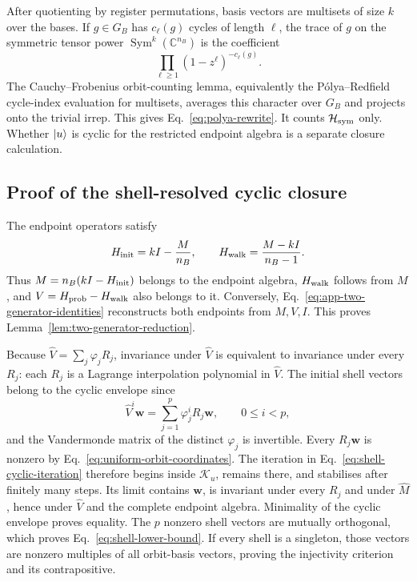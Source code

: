 After quotienting by register permutations, basis vectors are multisets of
size $k$ over the bases.  If $g\in G_B$ has $c_\ell(g)$ cycles
of length $\ell$, the trace of $g$ on
the symmetric tensor power $\operatorname{Sym}^k(\mathbb C^{n_B})$ is the
coefficient
\begin{equation}
 [z^k]\prod_{\ell\geq1}(1-z^\ell)^{-c_\ell(g)}.
\end{equation}
The Cauchy--Frobenius orbit-counting lemma, equivalently the
P\'olya--Redfield cycle-index evaluation for multisets, averages this
character over $G_B$ and projects onto the trivial irrep.  This gives
Eq.~\eqref{eq:polya-rewrite}.  It counts
$\mathcal H_{\rm sym}$ only.  Whether $\lvert u\rangle$ is cyclic for the restricted
endpoint algebra is a separate closure calculation.

\subsection{Proof of the shell-resolved cyclic closure}

The endpoint operators satisfy
\begin{equation}
 H_{\rm init}=kI-\frac{M}{n_B},
 \qquad
 H_{\rm walk}=\frac{M-kI}{n_B-1}.
 \label{eq:app-two-generator-identities}
\end{equation}
Thus $M=n_B(kI-H_{\rm init})$ belongs to the endpoint algebra,
$H_{\rm walk}$ follows from $M$, and
$V=H_{\rm prob}-H_{\rm walk}$ also belongs to it.  Conversely,
Eq.~\eqref{eq:app-two-generator-identities} reconstructs both endpoints
from $M,V,I$.  This proves Lemma~\ref{lem:two-generator-reduction}.

Because $\widehat V=\sum_j\varphi_jR_j$, invariance under $\widehat V$ is
equivalent to invariance under every $R_j$: each $R_j$ is a Lagrange
interpolation polynomial in $\widehat V$.  The initial shell vectors belong
to the cyclic envelope since
\begin{equation}
 \widehat V^i\boldsymbol w
 =\sum_{j=1}^p\varphi_j^iR_j\boldsymbol w,
 \qquad 0\leq i<p,
\end{equation}
and the Vandermonde matrix of the distinct $\varphi_j$ is invertible.
Every $R_j\boldsymbol w$ is nonzero by
Eq.~\eqref{eq:uniform-orbit-coordinates}.
The iteration in Eq.~\eqref{eq:shell-cyclic-iteration} therefore begins
inside $\mathcal K_u$, remains there, and stabilises after finitely many
steps.  Its limit contains $\boldsymbol w$, is invariant under every $R_j$ and under
$\widehat M$, hence under $\widehat V$ and the complete endpoint algebra.
Minimality of the cyclic envelope proves equality.  The $p$ nonzero shell
vectors are mutually orthogonal, which proves
Eq.~\eqref{eq:shell-lower-bound}.  If every shell is a singleton, those
vectors are nonzero multiples of all orbit-basis vectors, proving the
injectivity criterion and its contrapositive.

